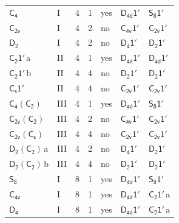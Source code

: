 \documentclass[10pt,a4paper]{article}
\numberwithin{equation}{section}
\newcommand{\grp}[1]{\mathsf{#1}}
\newcommand{\clsletter}[1]{\,{\scriptsize\color{black!55}#1}}
\begin{document}
{\begin{longtable}{@{}llrrlll@{}}
\href{../../../rotation/data/pdf/C4.pdf}{$\grp{C_{4}}$} & I & 4 & 1 & yes & \href{D4d-1p.pdf}{$\grp{D_{4d}1'}$} & \href{S8-1p.pdf}{$\grp{S_{8}1'}$}\\
\href{../../../rotation/data/pdf/C2v.pdf}{$\grp{C_{2v}}$} & I & 4 & 2 & no & \href{C4v-1p.pdf}{$\grp{C_{4v}1'}$} & \href{C2v-1p.pdf}{$\grp{C_{2v}1'}$}\\
\href{../../../rotation/data/pdf/D2.pdf}{$\grp{D_{2}}$} & I & 4 & 2 & no & \href{D4-1p.pdf}{$\grp{D_{4}1'}$} & \href{D2-1p.pdf}{$\grp{D_{2}1'}$}\\
\href{C2-1p.pdf}{$\grp{C_{2}1'}$}\clsletter{a} & II & 4 & 1 & yes & \href{D4d-1p.pdf}{$\grp{D_{4d}1'}$} & \href{D4d-1p.pdf}{$\grp{D_{4d}1'}$}\\
\href{C2-1p.pdf}{$\grp{C_{2}1'}$}\clsletter{b} & II & 4 & 4 & no & \href{D2-1p.pdf}{$\grp{D_{2}1'}$} & \href{D2-1p.pdf}{$\grp{D_{2}1'}$}\\
\href{C1v-1p.pdf}{$\grp{C_{s}1'}$} & II & 4 & 4 & no & \href{C2v-1p.pdf}{$\grp{C_{2v}1'}$} & \href{C2v-1p.pdf}{$\grp{C_{2v}1'}$}\\
\href{C4-C2.pdf}{$\grp{C_{4}}(\grp{C_{2}})$} & III & 4 & 1 & yes & \href{D4d-1p.pdf}{$\grp{D_{4d}1'}$} & \href{S8-1p.pdf}{$\grp{S_{8}1'}$}\\
\href{C2v-C2.pdf}{$\grp{C_{2v}}(\grp{C_{2}})$} & III & 4 & 2 & no & \href{C4v-1p.pdf}{$\grp{C_{4v}1'}$} & \href{C2v-1p.pdf}{$\grp{C_{2v}1'}$}\\
\href{C2v-C1v.pdf}{$\grp{C_{2v}}(\grp{C_{s}})$} & III & 4 & 4 & no & \href{C2v-1p.pdf}{$\grp{C_{2v}1'}$} & \href{C2v-1p.pdf}{$\grp{C_{2v}1'}$}\\
\href{D2-C2.pdf}{$\grp{D_{2}}(\grp{C_{2}})$}\clsletter{a} & III & 4 & 2 & no & \href{D4-1p.pdf}{$\grp{D_{4}1'}$} & \href{D2-1p.pdf}{$\grp{D_{2}1'}$}\\
\href{D2-C2.pdf}{$\grp{D_{2}}(\grp{C_{2}})$}\clsletter{b} & III & 4 & 4 & no & \href{D2-1p.pdf}{$\grp{D_{2}1'}$} & \href{D2-1p.pdf}{$\grp{D_{2}1'}$}\\
\href{../../../rotation/data/pdf/S8.pdf}{$\grp{S_{8}}$} & I & 8 & 1 & yes & \href{D4d-1p.pdf}{$\grp{D_{4d}1'}$} & \href{S8-1p.pdf}{$\grp{S_{8}1'}$}\\
\href{../../../rotation/data/pdf/C4v.pdf}{$\grp{C_{4v}}$} & I & 8 & 1 & yes & \href{D4d-1p.pdf}{$\grp{D_{4d}1'}$} & \href{C2-1p.pdf}{$\grp{C_{2}1'}$}\clsletter{a}\\
\href{../../../rotation/data/pdf/D4.pdf}{$\grp{D_{4}}$} & I & 8 & 1 & yes & \href{D4d-1p.pdf}{$\grp{D_{4d}1'}$} & \href{C2-1p.pdf}{$\grp{C_{2}1'}$}\clsletter{a}\\

\end{longtable}}
\end{document}
